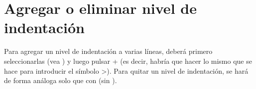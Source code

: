 \section{Agregar o eliminar nivel de indentación}\label{sec:vim-niv-indent}
Para agregar un nivel de indentación a varias líneas, deberá primero seleccionarlas (vea
) y luego pulsar \tecla{\(\Uparrow\)} + \tecla{<} (es decir, habría que hacer lo mismo
que se hace para introducir el símbolo \textsf{>}). Para quitar un nivel de indentación, se hará de forma
análoga solo que con \tecla{<} (sin \tecla{\(\Uparrow\)}).
